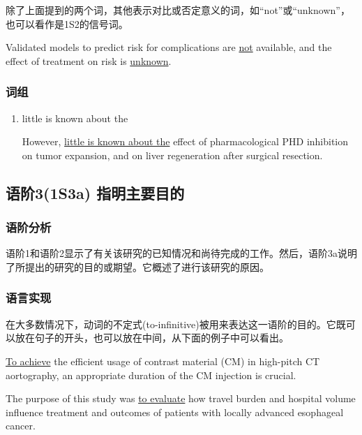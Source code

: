 \documentclass[a4paper]{ctexbook}
\begin{document}
    除了上面提到的两个词，其他表示对比或否定意义的词，如“not”或“unknown”，也可以看作是1S2的信号词。

    \begin{eg}{}
      Validated models to predict risk for complications are \uline{not} available, and the effect of treatment on risk is \uline{unknown}.
    \end{eg}

    \subsubsection{词组}

    \begin{enumerate}
      \item little is known about the
      \begin{eg}{}
        However, \uline{little is known about the} effect of pharmacological PHD inhibition on tumor expansion, and on liver regeneration after surgical resection.
      \end{eg}
    \end{enumerate}

  \subsection{语阶3(1S3a) 指明主要目的}

    \subsubsection{语阶分析}

    语阶1和语阶2显示了有关该研究的已知情况和尚待完成的工作。然后，语阶3a说明了所提出的研究的目的或期望。它概述了进行该研究的原因。

    \subsubsection{语言实现}

    在大多数情况下，动词的不定式(to-infinitive)被用来表达这一语阶的目的。它既可以放在句子的开头，也可以放在中间，从下面的例子中可以看出。

    \begin{eg}{}
      \uline{To achieve} the efficient usage of contrast material (CM) in high-pitch CT aortography, an appropriate duration of the CM injection is crucial.
    \end{eg}

    \begin{eg}{}
      The purpose of this study was \uline{to evaluate} how travel burden and hospital volume influence treatment and outcomes of patients with locally advanced esophageal cancer.
    \end{eg}
\end{document}
